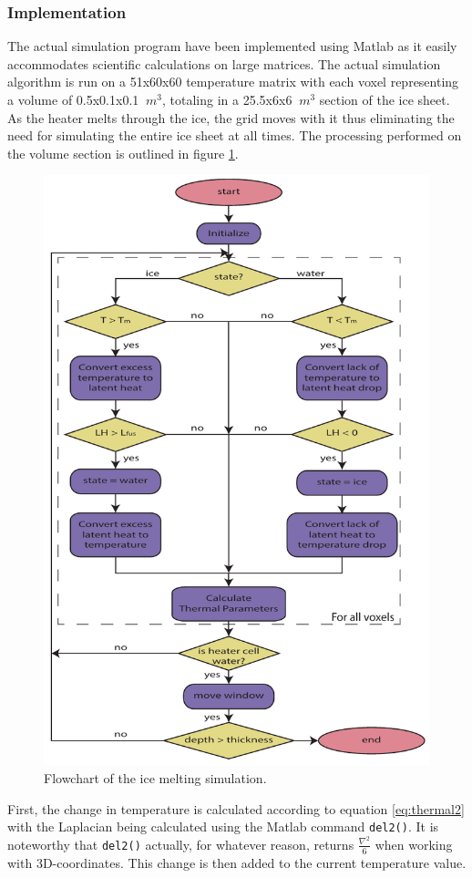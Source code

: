 \subsubsection{Implementation}
The actual simulation program have been implemented using Matlab as it easily accommodates scientific calculations on large matrices. The actual simulation algorithm is run on a 51x60x60 temperature matrix with each voxel representing a volume of 0.5x0.1x0.1 $\SI{}{m^3}$, totaling in a 25.5x6x6 $\SI{}{m^3}$ section of the ice sheet. As the heater melts through the ice, the grid moves with it thus eliminating the need for simulating the entire ice sheet at all times. The processing performed on the volume section is outlined in figure \ref{fig:iceSimFlow}.\\

 \begin{figure}[ht]
 	\centering
 	\includegraphics[width=.55\textwidth]{figures/LAMC/iceSimFlowchart.pdf}
 	\caption{Flowchart of the ice melting simulation.}
 	\label{fig:iceSimFlow}
 \end{figure}
 
\noindent
First, the change in temperature is calculated according to equation \ref{eq:thermal2} with the Laplacian being calculated using the Matlab command \texttt{del2()}. It is noteworthy that \texttt{del2()} actually, for whatever reason, returns $\frac{\nabla^2}{6}$ when working with 3D-coordinates. This change is then added to the current temperature value.\\

